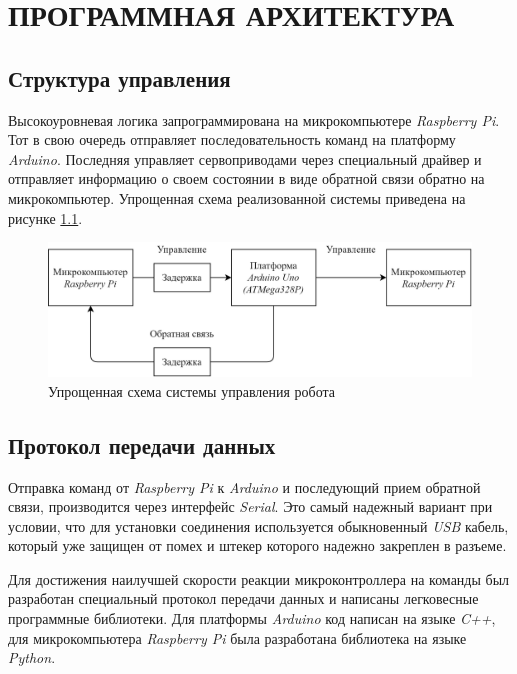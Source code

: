 \chapter{\MakeUppercase{Программная архитектура}} \label{chap:arch}
\section{Структура управления}

Высокоуровневая логика запрограммирована на микрокомпьютере \textit{Raspberry Pi}. Тот в свою очередь отправляет последовательность команд на платформу \textit{Arduino}. Последняя управляет сервоприводами через специальный драйвер и отправляет информацию о своем состоянии в виде обратной связи обратно на микрокомпьютер. Упрощенная схема реализованной системы приведена на рисунке \ref{fig:upravlenie}.

\begin{figure}[h!]
    \centering
    \includegraphics[width=\textwidth]{chapter_arch/figure2.png}
    \caption{Упрощенная схема системы управления робота}
    \label{fig:upravlenie}
\end{figure}

\section{Протокол передачи данных} \label{sec:protocol}
Отправка команд от \textit{Raspberry Pi} к \textit{Arduino} и последующий прием обратной связи, производится через интерфейс \textit{Serial}. Это самый надежный вариант при условии, что для установки соединения используется обыкновенный \textit{USB} кабель, который уже защищен от помех и штекер которого надежно закреплен в разъеме.

Для достижения наилучшей скорости реакции микроконтроллера на команды был разработан специальный протокол передачи данных и написаны легковесные программные библиотеки. Для платформы \textit{Arduino} код написан на языке \textit{C++}, для микрокомпьютера \textit{Raspberry Pi} была разработана библиотека на языке \textit{Python}.

